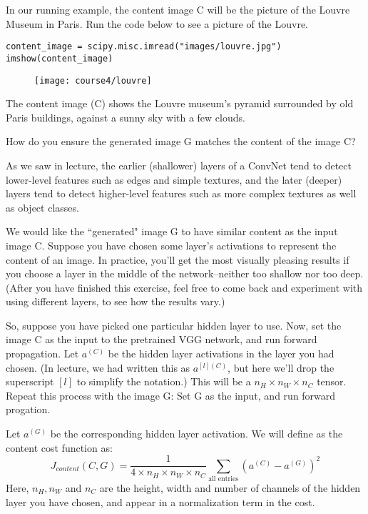 In our running example, the content image C will be the picture of the Louvre Museum in Paris. Run the code below to see a picture of the Louvre.
\begin{verbatim}
content_image = scipy.misc.imread("images/louvre.jpg")
imshow(content_image)
\end{verbatim}
\clearpage
\begin{figure}[h]
\begin{center}
\texttt{[image: course4/louvre]}
\end{center}
\end{figure}

The content image (C) shows the Louvre museum's pyramid surrounded by old Paris buildings, against a sunny sky with a few clouds.
\begin{tcolorbox}
How do you ensure the generated image G matches the content of the image C?
\end{tcolorbox}

As we saw in lecture, the earlier (shallower) layers of a ConvNet tend to detect lower-level features such as edges and simple textures, and the later (deeper) layers tend to detect higher-level features such as more complex textures as well as object classes. 

We would like the ``generated" image G to have similar content as the input image C. Suppose you have chosen some layer's activations to represent the content of an image. In practice, you'll get the most visually pleasing results if you choose a layer in the middle of the network--neither too shallow nor too deep. (After you have finished this exercise, feel free to come back and experiment with using different layers, to see how the results vary.)

So, suppose you have picked one particular hidden layer to use. Now, set the image C as the input to the pretrained VGG network, and run forward propagation. Let $a^{(C)}$ be the hidden layer activations in the layer you had chosen. (In lecture, we had written this as $a^{[l](C)}$, but here we'll drop the superscript $[l]$ to simplify the notation.) This will be a $n_H \times n_W \times n_C$ tensor. Repeat this process with the image G: Set G as the input, and run forward progation.

Let $a^{(G)}$ be the corresponding hidden layer activation. We will define as the content cost function as:
\begin{equation}
J_{content}(C,G) =  \frac{1}{4 \times n_H \times n_W \times n_C}\sum _{ \text{all entries}} (a^{(C)} - a^{(G)})^2
\end{equation}
Here, $n_H, n_W$ and $n_C$ are the height, width and number of channels of the hidden layer you have chosen, and appear in a normalization term in the cost. 

